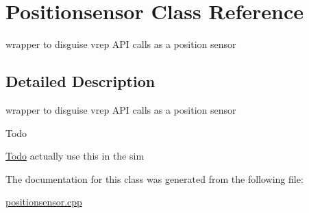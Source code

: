 \hypertarget{classPositionsensor}{}\section{Positionsensor Class Reference}
\label{classPositionsensor}


wrapper to disguise vrep A\+PI calls as a position sensor  




\subsection{Detailed Description}
wrapper to disguise vrep A\+PI calls as a position sensor 

\begin{DoxyRefDesc}{Todo}
\item[\hyperlink{todo__todo000004}{Todo}]actually use this in the sim \end{DoxyRefDesc}


The documentation for this class was generated from the following file\+:\begin{DoxyCompactItemize}
\item 
\hyperlink{positionsensor_8cpp}{positionsensor.\+cpp}\end{DoxyCompactItemize}
